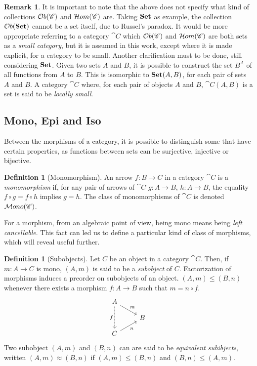 \documentclass[a4paper, twoside,openright]{report}
\theoremstyle{plain}
\theoremstyle{definition}
\newtheorem{definition}[theorem]{Definition}
\newtheorem{remark}[theorem]{Remark}
\begin{document}
\begin{remark}\label{rem:small_cats}
    It is important to note that the  above does not specify what kind of collections
    $\mathcal{O}b(\mathscr{C})$ and $\mathcal{H}om(\mathscr{C})$ are.
    Taking $\mathbf{Set}$ as example, the collection $\mathcal{O}b(\mathbf{Set})$ cannot be a set itself, due to Russel's paradox. It would be more appropriate referring to a category $\cat{C}$ which $\mathcal{O}b(\mathscr{C})$ and $\mathcal{H}om(\mathscr{C})$ are both sets as a \emph{small category}, but it is assumed in this work, except where it is made explicit, for a category to be small.
    Another clarification must to be done, still considering $\mathbf{Set}$. Given two sets $A$ and $B$, it is possible to construct the set $B^A$ of all functions from $A$ to $B$. This is isomorphic to $\mathbf{Set}(A, B)$, for each pair of sets $A$ and $B$.
    {\color{green}{rivedere}}
    A category $\cat C$ where, for each pair of objects $A$ and $B$, $\cat C (A, B)$ is a set is said to be \emph{locally small}.
\end{remark}

\subsection{Mono, Epi and Iso}\label{ssect:Mono_epi_iso}

Between the morphisms of a category, it is possible to distinguish some that have certain properties, as functions between sets can be surjective, injective or bijective.

\begin{definition}[Monomorphism]\label{def:mono}
    An arrow $f:B\rightarrow C$ in a category $\cat{C}$ is a \emph{monomorphism} if, for any pair of arrows of $\cat{C}$ $g:A \rightarrow B$, $h: A \rightarrow B$, the equality $f \circ g = f \circ h$ implies $g = h$. The class of monomorphisms of $\cat C$ is denoted $\mathcal{M}ono(\mathscr{C})$.
\end{definition}

For a morphism, from an algebraic point of view, being mono means being \emph{left cancellable}. This fact can led us to define a particular kind of class of morphisms, which will reveal useful further. 

\begin{definition}[Subobjects]
    Let $C$ be an object in a category $\cat C$. Then, if $m: A \rightarrow C$ is mono, $(A, m)$ is said to be a \emph{subobject} of $C$. Factorization of morphisms induces a preorder on subobjects of an object. $(A, m) \leq (B, n)$ whenever there exists a morphism $f : A\rightarrow B$ such that $m = n \circ f$.
    \[
        \begin{tikzcd}[row sep=9]
            A \arrow[dr, "m"] \arrow[dd, dashed, "f"swap] & \\
            & B \\
            C \arrow[ur, "n"swap] &
        \end{tikzcd}
    \]
    Two subobject $(A, m)$ and $(B, n)$ can are said to be \emph{equivalent subibjects}, written $(A, m) \approx (B, n)$ if $(A, m)\leq (B, n)$ and $(B, n) \leq (A, m)$.
\end{definition}
\end{document}
